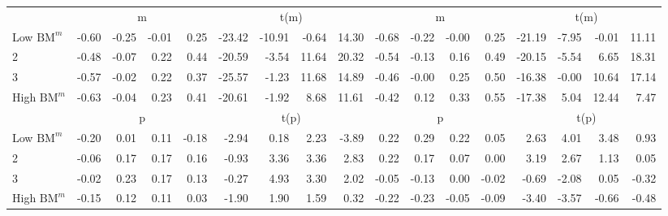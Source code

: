 \begin{table}[!ht]
\begin{tabular}{lrrrrrrrrrrrrrrrr}
                        & \multicolumn{4}{c}{m} & \multicolumn{4}{c}{t(m)} & \multicolumn{4}{c}{m} & \multicolumn{4}{c}{t(m)} \\
                          \cmidrule(r){2-5} \cmidrule(r){6-9} \cmidrule(r){10-13} \cmidrule(r){14-17}

    Low $\text{BM}^m$   & -0.60  & -0.25  & -0.01  & 0.25  & -23.42  & -10.91  & -0.64  & 14.30  & -0.68  & -0.22  & -0.00  & 0.25  & -21.19  & -7.95  & -0.01  & 11.11  \\
                     2  & -0.48  & -0.07  & 0.22  & 0.44  & -20.59  & -3.54  & 11.64  & 20.32  & -0.54  & -0.13  & 0.16  & 0.49  & -20.15  & -5.54  & 6.65  & 18.31  \\
                     3  & -0.57  & -0.02  & 0.22  & 0.37  & -25.57  & -1.23  & 11.68  & 14.89  & -0.46  & -0.00  & 0.25  & 0.50  & -16.38  & -0.00  & 10.64  & 17.14  \\
    High $\text{BM}^m$  & -0.63  & -0.04  & 0.23  & 0.41  & -20.61  & -1.92  & 8.68  & 11.61  & -0.42  & 0.12  & 0.33  & 0.55  & -17.38  & 5.04  & 12.44  & 7.47  \\

                        & \multicolumn{4}{c}{p} & \multicolumn{4}{c}{t(p)} & \multicolumn{4}{c}{p} & \multicolumn{4}{c}{t(p)} \\
                          \cmidrule(r){2-5} \cmidrule(r){6-9} \cmidrule(r){10-13} \cmidrule(r){14-17}

    Low $\text{BM}^m$   & -0.20  & 0.01  & 0.11  & -0.18  & -2.94  & 0.18  & 2.23  & -3.89  & 0.22  & 0.29  & 0.22  & 0.05  & 2.63  & 4.01  & 3.48  & 0.93  \\
                     2  & -0.06  & 0.17  & 0.17  & 0.16  & -0.93  & 3.36  & 3.36  & 2.83  & 0.22  & 0.17  & 0.07  & 0.00  & 3.19  & 2.67  & 1.13  & 0.05  \\
                     3  & -0.02  & 0.23  & 0.17  & 0.13  & -0.27  & 4.93  & 3.30  & 2.02  & -0.05  & -0.13  & 0.00  & -0.02  & -0.69  & -2.08  & 0.05  & -0.32  \\
    High $\text{BM}^m$  & -0.15  & 0.12  & 0.11  & 0.03  & -1.90  & 1.90  & 1.59  & 0.32  & -0.22  & -0.23  & -0.05  & -0.09  & -3.40  & -3.57  & -0.66  & -0.48  \\

  \bottomrule
\end{tabular}
\label{tbl:32_Size_BMm_Prior_B16}
\end{table}